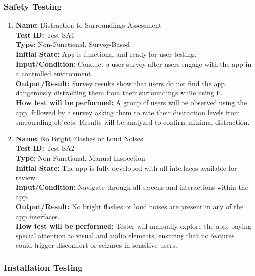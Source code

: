 \documentclass[12pt, titlepage]{article}
\begin{document}
\subsubsection{Safety Testing}

\begin{enumerate}

    \item \textbf{Name:} Distraction to Surroundings Assessment \label{itm:Test-SA1} \\
    \textbf{Test ID:} Test-SA1 \\
    \textbf{Type:} Non-Functional, Survey-Based \\
    \textbf{Initial State:} App is functional and ready for user testing. \\
    \textbf{Input/Condition:} Conduct a user survey after users engage with the app in a controlled environment. \\
    \textbf{Output/Result:} Survey results show that users do not find the app dangerously distracting them from their surroundings while using it. \\
    \textbf{How test will be performed:} A group of users will be observed using the app, followed by a survey asking them to rate their distraction levels from surrounding objects. Results will be analyzed to confirm minimal distraction.

    \item \textbf{Name:} No Bright Flashes or Loud Noises \label{itm:Test-SA2} \\
    \textbf{Test ID:} Test-SA2 \\
    \textbf{Type:} Non-Functional, Manual Inspection \\
    \textbf{Initial State:} The app is fully developed with all interfaces available for review. \\
    \textbf{Input/Condition:} Navigate through all screens and interactions within the app. \\
    \textbf{Output/Result:} No bright flashes or loud noises are present in any of the app interfaces. \\
    \textbf{How test will be performed:} Tester will manually explore the app, paying special attention to visual and audio elements, ensuring that no features could trigger discomfort or seizures in sensitive users.
\end{enumerate}

\subsubsection{Installation Testing}
\end{document}
